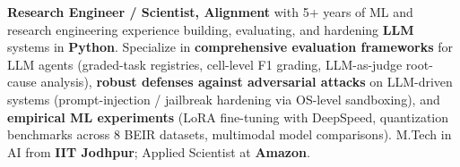 \documentclass[letter,10pt]{article}
\begin{document}

\textbf{Research Engineer / Scientist, Alignment} with 5+ years of ML and research engineering experience building, evaluating, and hardening \textbf{LLM} systems in \textbf{Python}.
Specialize in \textbf{comprehensive evaluation frameworks} for LLM agents (graded-task registries, cell-level F1 grading, LLM-as-judge root-cause analysis), \textbf{robust defenses against adversarial attacks} on LLM-driven systems (prompt-injection / jailbreak hardening via OS-level sandboxing), and \textbf{empirical ML experiments} (LoRA fine-tuning with DeepSpeed, quantization benchmarks across 8 BEIR datasets, multimodal model comparisons).
M.Tech in AI from \textbf{IIT Jodhpur}; Applied Scientist at \textbf{Amazon}.
\end{document}
